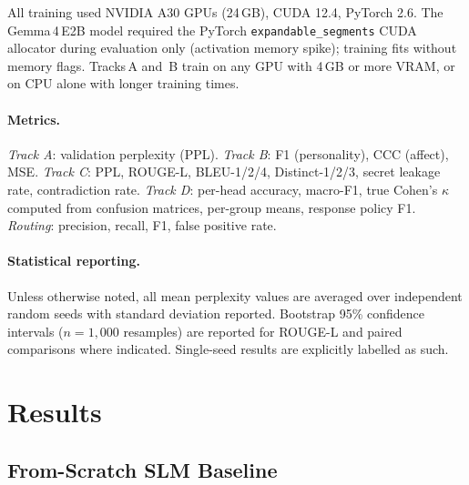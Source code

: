 \documentclass[11pt]{article}
\begin{document}
All training used NVIDIA A30 GPUs (24\,GB), CUDA 12.4, PyTorch 2.6.
The Gemma\,4\,E2B model required the PyTorch \texttt{expandable\_segments} CUDA allocator during evaluation only (activation memory spike); training fits without memory flags.
Tracks\,A and~B train on any GPU with 4\,GB or more VRAM, or on CPU alone with longer training times.

\paragraph{Metrics.}
\textit{Track A}: validation perplexity (PPL).
\textit{Track B}: F1 (personality), CCC (affect), MSE.
\textit{Track C}: PPL, ROUGE-L, BLEU-1/2/4, Distinct-1/2/3, secret leakage rate, contradiction rate.
\textit{Track D}: per-head accuracy, macro-F1, true Cohen's $\kappa$ computed from confusion matrices, per-group means, response policy F1.
\textit{Routing}: precision, recall, F1, false positive rate.

\paragraph{Statistical reporting.} Unless otherwise noted, all mean perplexity values are averaged over independent random seeds with standard deviation reported.
Bootstrap 95\% confidence intervals ($n{=}1{,}000$ resamples) are reported for ROUGE-L and paired comparisons where indicated.
Single-seed results are explicitly labelled as such.

\section{Results}
\label{sec:results}

\subsection{From-Scratch SLM Baseline}

\begin{table}[t]
\centering
\caption{From-scratch SLM validation perplexity (20 epochs, 3 seeds). \textbf{Bold}: best mean. GPT-22M is param-matched to MoE at $\sim$22M.}
\label{tab:slm}
\small
{}
\end{table}
\end{document}
